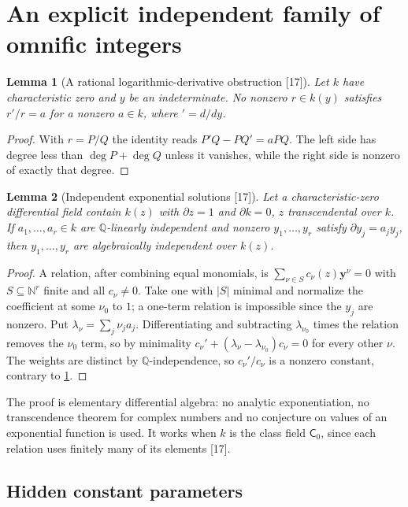 \documentclass[11pt,oneside]{article}
\numberwithin{equation}{section}
\newtheorem{lemma}[lemma]{Lemma}
\theoremstyle{definition}
\theoremstyle{remark}
\newcommand{\Q}{\mathbb Q}
\newcommand{\N}{\mathbb N}
\newcommand{\src}[1]{\textup{\textsf{\small[#1]}}}
\begin{document}
\section{An explicit independent family of omnific integers}\label{opa:of:sec:witnesses}

\begin{lemma}[A rational logarithmic-derivative obstruction \src{17}]\label{opa:of:lem:ratlog}
Let $k$ have characteristic zero and $y$ be an indeterminate. No nonzero $r\in k(y)$ satisfies $r'/r=a$ for a nonzero
$a\in k$, where ${}'=d/dy$.
\end{lemma}
\begin{proof}
With $r=P/Q$ the identity reads $P'Q-PQ'=aPQ$. The left side has degree less than $\deg P+\deg Q$ unless it vanishes, while the
right side is nonzero of exactly that degree.
\end{proof}

\begin{lemma}[Independent exponential solutions \src{17}]\label{opa:of:lem:expind}
Let a characteristic-zero differential field contain $k(z)$ with $\partial z=1$ and $\partial k=0$, $z$ transcendental over $k$.
If $a_1,\dots,a_r\in k$ are $\Q$-linearly independent and nonzero $y_1,\dots,y_r$ satisfy $\partial y_j=a_jy_j$, then
$y_1,\dots,y_r$ are algebraically independent over $k(z)$.
\end{lemma}
\begin{proof}
A relation, after combining equal monomials, is $\sum_{\nu\in S}c_\nu(z)\mathbf y^\nu=0$ with $S\subseteq\N^r$ finite and all
$c_\nu\ne0$. Take one with $|S|$ minimal and normalize the coefficient at some $\nu_0$ to $1$; a one-term relation is impossible
since the $y_j$ are nonzero. Put $\lambda_\nu=\sum_j\nu_ja_j$. Differentiating and subtracting $\lambda_{\nu_0}$ times the relation
removes the $\nu_0$ term, so by minimality $c_\nu'+(\lambda_\nu-\lambda_{\nu_0})c_\nu=0$ for every other $\nu$. The weights are
distinct by $\Q$-independence, so $c_\nu'/c_\nu$ is a nonzero constant, contrary to \cref{opa:of:lem:ratlog}.
\end{proof}

The proof is elementary differential algebra: no analytic exponentiation, no transcendence theorem for complex numbers and
no conjecture on values of an exponential function is used. It works when $k$ is the class field $\mathsf C_0$, since each
relation uses finitely many of its elements \src{17}.

\subsection{Hidden constant parameters}
\end{document}
